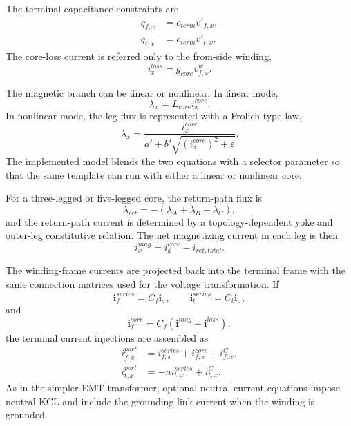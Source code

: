 The terminal capacitance constraints are
\begin{align}
    q_{f,x} &= c_{term}v'_{f,x}, \\
    q_{t,x} &= c_{term}v'_{t,x}.
\end{align}
The core-loss current is referred only to the from-side winding,
\begin{equation}
    i^{loss}_x = g_{core}v^w_{f,x}.
\end{equation}

The magnetic branch can be linear or nonlinear. In linear mode,
\begin{equation}
    \lambda_x = L_{core}i^{core}_x.
\end{equation}
In nonlinear mode, the leg flux is represented with a Frolich-type law,
\begin{equation}
    \lambda_x = \frac{i^{core}_x}{a' + b'\sqrt{{(i^{core}_x)}^2+\varepsilon}}.
\end{equation}
The implemented model blends the two equations with a selector parameter so that the same template can run with either a linear or nonlinear core.

For a three-legged or five-legged core, the return-path flux is
\begin{equation}
    \lambda_{ret}= -\left(\lambda_A+\lambda_B+\lambda_C\right),
\end{equation}
and the return-path current is determined by a topology-dependent yoke and outer-leg constitutive relation. The net magnetizing current in each leg is then
\begin{equation}
    i^{mag}_x = i^{core}_x - i_{ret,total}.
\end{equation}

The winding-frame currents are projected back into the terminal frame with the same connection matrices used for the voltage transformation. If
\begin{equation}
    \mathbf{i}^{series}_f=C_f\mathbf{i}_\sigma, \qquad
    \mathbf{i}^{series}_t=C_t\mathbf{i}_\sigma,
\end{equation}
and
\begin{equation}
    \mathbf{i}^{core}_f=C_f\left(\mathbf{i}^{mag}+\mathbf{i}^{loss}\right),
\end{equation}
the terminal current injections are assembled as
\begin{align}
    i^{port}_{f,x} &= i^{series}_{f,x}+i^{core}_{f,x}+i^C_{f,x}, \\
    i^{port}_{t,x} &= -n i^{series}_{t,x}+i^C_{t,x}.
\end{align}
As in the simpler EMT transformer, optional neutral current equations impose neutral KCL and include the grounding-link current when the winding is grounded.

